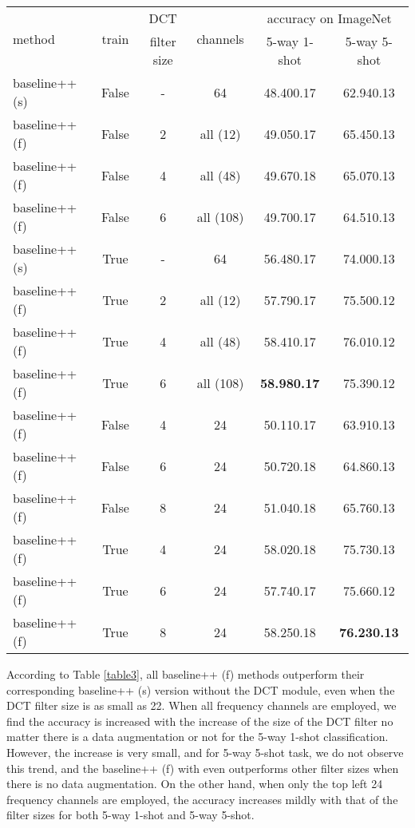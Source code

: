 \documentclass[10pt, conference, compsocconf]{IEEEtran}
\begin{document}
\begin{table*}[ht]
\centering
\caption{The effect of different sizes of DCT filters and whether we select frequency channels with backbone ResNet18 on ImageNet.  The number of channels denotes the channels before the backbone with the input layers removed, e.g. for ResNet, the input before the basic backbone is . The highest accuracy (\%) is highlighted.}
\begin{tabular}{l|c|c|c|cc}
\toprule
\multirow{2}{*}{method} &\multirow{2}{*}{train} & {DCT} & \multirow{2}{*}{channels} & \multicolumn{2}{c}{accuracy on ImageNet} \\
& & filter size & &5-way 1-shot& 5-way 5-shot\\ \hline
baseline++ (s) & False & - & 64 & 48.400.17 & 62.940.13 \\
baseline++ (f) & False & 2 & all (12)& 49.050.17 & 65.450.13 \\
baseline++ (f) & False & 4 & all (48)& 49.670.18 & 65.070.13 \\
baseline++ (f) & False & 6 & all (108)& 49.700.17 & 64.510.13 \\\hline
baseline++ (s) & True & - & 64 & 56.480.17 & 74.000.13 \\

baseline++ (f) & True  & 2 & all (12)& 57.790.17 & 75.500.12 \\
baseline++ (f) & True  & 4 & all (48)& 58.410.17 & 76.010.12 \\
baseline++ (f) & True  & 6 & all (108)& \bf{58.980.17} & 75.390.12 \\\hline\hline

baseline++ (f) & False & 4 & 24 & 50.110.17 & 63.910.13 \\
baseline++ (f) & False & 6 & 24& 50.720.18 & 64.860.13 \\
baseline++ (f) & False & 8 & 24& 51.040.18 & 65.760.13 \\\hline



baseline++ (f) & True  & 4 & 24 & 58.020.18 & 75.730.13 \\
baseline++ (f) & True  & 6 & 24& 57.740.17 &75.660.12 \\
baseline++ (f) & True  & 8 & 24& 58.250.18 & \bf{76.230.13} \\
\bottomrule
\end{tabular}
\label{table3}
\end{table*}

According to Table \ref{table3}, all baseline++ (f) methods outperform their corresponding baseline++ (s) version without the DCT module, even when the DCT filter size is as small as 22. When all frequency channels are employed, we find the accuracy is increased with the increase of the size of the DCT filter no matter there is a data augmentation or not for the 5-way 1-shot classification. However, the increase is very small, and for 5-way 5-shot task, we do not observe this trend, and the baseline++ (f) with  even outperforms other filter sizes when there is no data augmentation. On the other hand, when only the top left 24 frequency channels are employed, the accuracy increases mildly with that of the filter sizes for both 5-way 1-shot and 5-way 5-shot.
\end{document}
